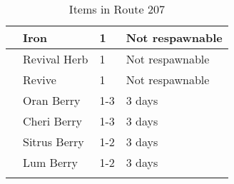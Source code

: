 \begin{longtable}{|| l l l l ||}%
\hline%
&Iron&1&Not respawnable\\%
\hline%
&Revival Herb&1&Not respawnable\\%
\hline%
&Revive&1&Not respawnable\\%
\hline%
&Oran Berry&1{-}3&3 days\\%
\hline%
&Cheri Berry&1{-}3&3 days\\%
\hline%
&Sitrus Berry&1{-}2&3 days\\%
\hline%
&Lum Berry&1{-}2&3 days\\%
\hline%
\endhead%
\hline%
\caption{Items in Route 207}%
\label{tab:Route207Items}%
\end{longtable}